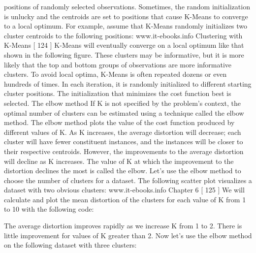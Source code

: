 positions of randomly selected observations. Sometimes, the random initialization
is unlucky and the centroids are set to positions that cause K-Means to converge to a
local optimum. For example, assume that K-Means randomly initializes two cluster
centroids to the following positions:
www.it-ebooks.info
Clustering with K-Means
[ 124 ]
K-Means will eventually converge on a local optimum like that shown in the
following figure. These clusters may be informative, but it is more likely that the
top and bottom groups of observations are more informative clusters. To avoid
local optima, K-Means is often repeated dozens or even hundreds of times. In
each iteration, it is randomly initialized to different starting cluster positions. The
initialization that minimizes the cost function best is selected.
The elbow method
If K is not specified by the problem's context, the optimal number of clusters can
be estimated using a technique called the elbow method. The elbow method plots
the value of the cost function produced by different values of K. As K increases,
the average distortion will decrease; each cluster will have fewer constituent
instances, and the instances will be closer to their respective centroids. However,
the improvements to the average distortion will decline as K increases. The value
of K at which the improvement to the distortion declines the most is called the
elbow. Let's use the elbow method to choose the number of clusters for a dataset.
The following scatter plot visualizes a dataset with two obvious clusters:
www.it-ebooks.info
Chapter 6
[ 125 ]
We will calculate and plot the mean distortion of the clusters for each value of K
from 1 to 10 with the following code:

The average distortion improves rapidly as we increase K from 1 to 2. There is little
improvement for values of K greater than 2. Now let's use the elbow method on the
following dataset with three clusters:

